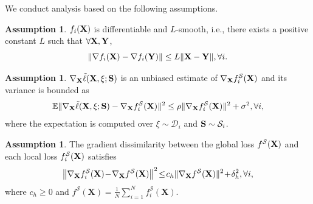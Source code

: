 \documentclass{article} %
\theoremstyle{plain}
\theoremstyle{definition}
\newtheorem{assumption}[theorem]{Assumption}
\begin{document}
We conduct analysis based on the following assumptions. 
\begin{assumption}\label{smoothness_assumption}
    \(f_i ({\bf X})\) is differentiable and \(L\)-smooth, i.e., there exists a positive constant \(L\) such that \(\forall {\bf X},{\bf Y}\),
    \[
    \|\nabla f_i({\bf X}) - \nabla f_i({\bf Y})\| \leq L \|{\bf X} - {\bf Y}\|, \forall i.
    \]
\end{assumption}
\begin{assumption}\label{varaince_assumption}
$\nabla_{\bf X}  \tilde{\ell} ({\bf X}, \xi; {\bf S}) $ is an unbiased estimate of $\nabla_{\bf X}  f_i^{\mathcal{S}} ({\bf X})$ and its variance is bounded as 
$$\mathbb{E}\| \nabla_{\bf X}  \tilde{\ell} ({\bf X}, \xi; {\bf S})  - \nabla_{\bf X}  f_i^{\mathcal{S}} ({\bf X})\|^2 \leq \rho \|\nabla_{\bf X}  f_i^{\mathcal{S}} ({\bf X})\|^2 +  \sigma^2, \forall i,$$
where the expectation is computed over $\xi \sim \mathcal{D}_i$ and ${\bf S}\sim \mathcal{S}_i$. 
\end{assumption}
\begin{assumption}\label{assumption:gradient_dissimilarity}
The gradient dissimilarity between the global loss \(f^{\mathcal{S}}(\bf X)\) and each local loss \( f_i^{\mathcal{S}}(\bf X) \) satisfies
\begin{equation}
\left\| \nabla_{\bf X} f_i^{\mathcal{S}}({\bf X}) \!-\! \nabla_{\bf X} f^{\mathcal{S}}(\bf X) \right\|^2 \! \leq \! c_h \| \nabla_{\bf X} f^{\mathcal{S}}({\bf X}) \|^2  \!+\! \delta_h^2, \forall i, \nonumber
\end{equation}
where \(c_h \geq 0\) and \(f^{\mathcal{S}}(\mathbf{X}) = \frac{1}{N} \sum_{i=1}^N f_i^{\mathcal{S}}(\mathbf{X}) \).
\end{assumption}
\end{document}
